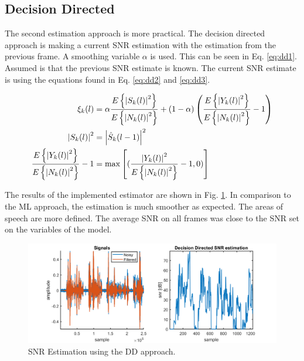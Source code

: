 \newpage
\subsection{Decision Directed}
The second estimation approach is more practical. The decision directed approach is making a current SNR estimation with the estimation from the previous frame. A smoothing variable $\alpha$ is used. This can be seen in Eq. \ref{eq:dd1}. Assumed is that the previous SNR estimate is known. The current SNR estimate is using the equations found in Eq. \ref{eq:dd2} and \ref{eq:dd3}.


\begin{align}
  \xi_{k}(l) &= \alpha \frac{E\left\{\abs{S_{k}(l)}^{2}\right\}}{E\left\{\abs{N_{k}(l)}^{2}\right\}} +
  (1-\alpha)\left(\frac{E\left\{\abs{Y_{k}(l)}^{2}\right\}}{E\left\{\abs{N_{k}(l)}^{2}\right\}} - 1\right)
  \label{eq:dd1}\\
  \abs{S_{k}(l)}^{2} &= \abs{\hat S_{k}(l-1)}^{2}
  \label{eq:dd2} \\
  \frac{E\left\{\abs{Y_{k}(l)}^{2}\right\}}{E\left\{\abs{N_{k}(l)}^{2}\right\}} - 1 &=
  \max \left[(\frac{\abs{Y_{k}(l)}^{2}}{E\left\{\abs{N_{k}(l)}^{2}\right\}}-1,0)\right]
  \label{eq:dd3}
\end{align}

The results of the implemented estimator are shown in Fig. \ref{fig:ddsnr}. In comparison to the ML approach, the estimation is much smoother as expected. The areas of speech are more defined. The average SNR on all frames was close to the SNR set on the variables of the model.

\begin{figure}[h]
  \centering
  \includegraphics[width=\textwidth]{images/ddsnr.png}
  \caption{SNR Estimation using the DD approach.}
  \label{fig:ddsnr}
\end{figure}
